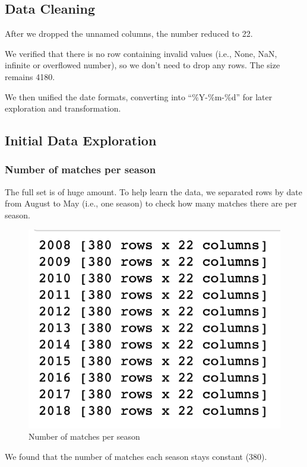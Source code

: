 \documentclass{article}
\begin{document}
\subsection{Data Cleaning}

After we dropped the unnamed columns, the number reduced to 22.

We verified that there is no row containing invalid values (i.e., None, NaN, infinite or overflowed number), so we don’t need to drop any rows. The size remains 4180.

We then unified the date formats, converting into “\%Y-\%m-\%d” for later exploration and transformation.
\subsection{Initial Data Exploration}
\subsubsection{Number of matches per season}
The full set is of huge amount. To help learn the data, we separated rows by date from August to May (i.e., one season) to check how many matches there are per season.
\begin{figure}[ht]
\centering
\includegraphics[scale=0.6]{graphs/matchesPerSeason.png}
\caption{Number of matches per season}
\label{fig:matchesPerSeason}
\end{figure}

We found that the number of matches each season stays constant (380).
\end{document}
